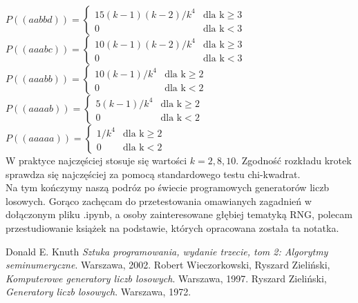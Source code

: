 \documentclass[a4paper]{scrartcl}
\begin{document}
$P((aabbd)) =
\begin{cases}
15(k-1)(k-2)/k^4 &\text{dla k} \geq 3\\
0 & \text{dla k} < 3
\end{cases}$\\
$P((aaabc)) =
\begin{cases}
10(k-1)(k-2)/k^4 &\text{dla k} \geq 3\\
0 & \text{dla k} < 3
\end{cases}$\\
$P((aaabb)) =
\begin{cases}
10(k-1)/k^4 &\text{dla k} \geq 2\\
0 & \text{dla k} < 2
\end{cases}$\\
$P((aaaab)) =
\begin{cases}
5(k-1)/k^4 &\text{dla k} \geq 2\\
0 & \text{dla k} < 2
\end{cases}$\\
$P((aaaaa)) =
\begin{cases}
1/k^4 &\text{dla k} \geq 2\\
0 & \text{dla k} < 2
\end{cases}$\\
W praktyce najczęściej stosuje się wartości $k=2,8,10$. Zgodność rozkładu krotek sprawdza się najczęściej za pomocą standardowego testu chi-kwadrat.\\
\null\qquad Na tym kończymy naszą podróz po świecie programowych generatorów liczb losowych. Gorąco zachęcam do przetestowania omawianych zagadnień w dołączonym pliku .ipynb, a osoby zainteresowane głębiej tematyką RNG, polecam przestudiowanie książek na podstawie, których opracowana została ta notatka.
\clearpage
\begin{thebibliography}{1}
Donald E. Knuth
\textit{Sztuka programowania, wydanie trzecie, tom 2: Algorytmy seminumeryczne}.
Warszawa, 2002.
Robert Wieczorkowski, Ryszard Zieliński, 
\textit{Komputerowe generatory liczb losowych}.
Warszawa, 1997.
Ryszard Zieliński, 
\textit{Generatory liczb losowych}. 
Warszawa, 1972.

\end{thebibliography}
\end{document}
